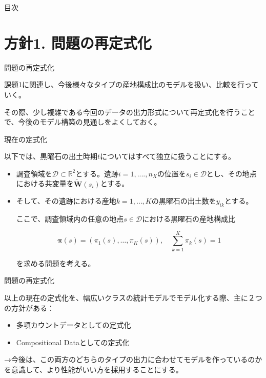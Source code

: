 \documentclass[xelatex, 8pt]{beamer}
\theoremstyle{plain}
\theoremstyle{definition}
\begin{document}
\begin{frame}
{\Large 目次}
 \tableofcontents[currentsection]
\end{frame}


\section{方針1. 問題の再定式化}

\begin{frame}{問題の再定式化}

    課題1に関連し、今後様々なタイプの産地構成比のモデルを扱い、比較を行っていく。

    その際、少し複雑である今回のデータの出力形式について再定式化を行うことで、今後のモデル構築の見通しをよくしておく。

\end{frame}

\begin{frame}{現在の定式化}

以下では、黒曜石の出土時期$t$についてはすべて独立に扱うことにする。

\begin{itemize}
\item 調査領域を$\mathcal{D} \subset \mathbb{R}^2$とする。遺跡$i = 1, ...., n_{X}$の位置を$s_i \in \mathcal{D}$とし、その地点における共変量を$\tilde{\boldsymbol{W}}(s_i)$とする。
\item そして、その遺跡における産地$k=1, \ldots, K$の黒曜石の出土数を$y_{ik}$とする。

\vspace{2mm}

ここで、調査領域内の任意の地点$s \in \mathcal{D}$における黒曜石の産地構成比

$$
\boldsymbol{\pi}(s) = (\pi_1(s), \ldots , \pi_{K}(s)), \quad \sum_{k=1}^{K}\pi_k(s) = 1$$

を求める問題を考える。
\end{itemize}
\end{frame}

\begin{frame}{問題の再定式化}

    以上の現在の定式化を、幅広いクラスの統計モデルでモデル化する際、主に２つの方針がある：

    \begin{itemize}
        \item 多項カウントデータとしての定式化
        \item Compositional Dataとしての定式化
    \end{itemize}

    \vspace{3mm}

    →今後は、この両方のどちらのタイプの出力に合わせてモデルを作っているのかを意識して、より性能がいい方を採用することにする。

\end{frame}
\end{document}
